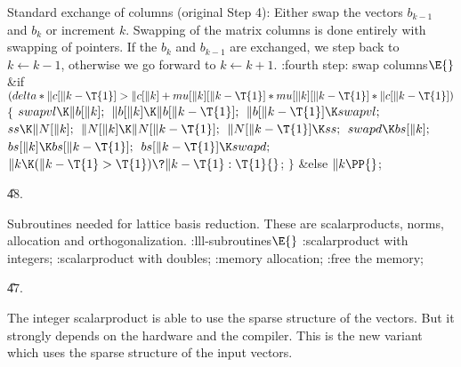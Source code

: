 Standard exchange of columns
(original Step 4):
Either swap the vectors $b_{k-1}$ and  $b_k$ or increment $k$.
Swapping of the matrix columns is done entirely with swapping of
pointers.
If the $b_k$ and $b_{k-1}$ are exchanged, we step back to
$k\leftarrow k-1$, otherwise we go forward to $k\leftarrow k+1$.
\Y\B\4:fourth step: swap columns\X${}\E{}$\6
\&{if} ${}(\\{delta}*\|c[\|k-\T{1}]>\|c[\|k]+\\{mu}[\|k][\|k-\T{1}]*\\{mu}[%
\|k][\|k-\T{1}]*\|c[\|k-\T{1}]){}$\5
${}\{{}$\1\6
${}\\{swapvl}\K\|b[\|k];{}$\6
${}\|b[\|k]\K\|b[\|k-\T{1}];{}$\6
${}\|b[\|k-\T{1}]\K\\{swapvl};{}$\6
${}\\{ss}\K\|N[\|k];{}$\6
${}\|N[\|k]\K\|N[\|k-\T{1}];{}$\6
${}\|N[\|k-\T{1}]\K\\{ss};{}$\6
${}\\{swapd}\K\\{bs}[\|k];{}$\6
${}\\{bs}[\|k]\K\\{bs}[\|k-\T{1}];{}$\6
${}\\{bs}[\|k-\T{1}]\K\\{swapd};{}$\6
${}\|k\K(\|k-\T{1}>\T{1})\?\|k-\T{1}:\T{1}{}$;\6
\4${}\}{}$\2\6
\&{else}\1\5
${}\|k\PP{}$;\2\par
\U48.\fi

Subroutines needed for lattice basis reduction.
These are scalarproducts, norms, allocation and orthogonalization.
\Y\B\4:lll-subroutines\X${}\E{}$\6
:scalarproduct with integers\X;\6
:scalarproduct with doubles\X;\6
:memory allocation\X;\6
:free the memory\X;\par
\U47.\fi

The integer scalarproduct is able to use the sparse structure of the
vectors. But it strongly depends on the hardware and the compiler.
This is the new variant which uses the sparse structure of the input
vectors.

